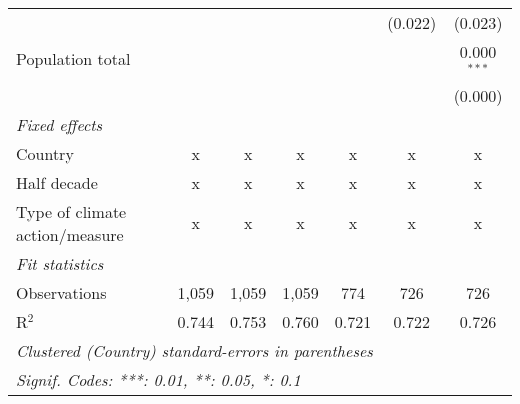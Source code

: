 \begin{tabular}{lcccccc}
                                                                                    &               &               &               &               & (0.022)       & (0.023)\\   
   Population total                                                                 &               &               &               &               &               & 0.000$^{***}$\\   
                                                                                    &               &               &               &               &               & (0.000)\\   
   \emph{Fixed effects}\\
   Country                                                                          & x             & x             & x             & x             & x             & x\\  
   Half decade                                                                      & x             & x             & x             & x             & x             & x\\  
   Type of climate action/measure                                                   & x             & x             & x             & x             & x             & x\\  
   \midrule \emph{Fit statistics}\\
   Observations                                                                     & 1,059         & 1,059         & 1,059         & 774           & 726           & 726\\  
   R$^2$                                                                            & 0.744         & 0.753         & 0.760         & 0.721         & 0.722         & 0.726\\  
   \midrule
   \multicolumn{7}{l}{\emph{Clustered (Country) standard-errors in parentheses}}\\
   \multicolumn{7}{l}{\emph{Signif. Codes: ***: 0.01, **: 0.05, *: 0.1}}\\
\end{tabular}
\par\endgroup


